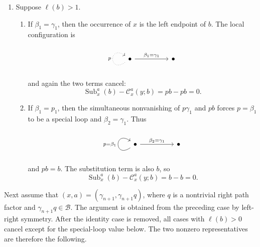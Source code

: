 \documentclass[11pt,a4paper,reqno]{amsart}
\newcommand{\mB}{\mathcal B}
\newcommand{\mC}{\mathcal C}
\newcommand{\Sub}{\operatorname{Sub}}
\newcommand{\para}[2]{(#1,#2)}
\theoremstyle{plain}
\theoremstyle{definition}
\numberwithin{equation}{section}
\begin{document}
\begin{enumerate}
		\item Suppose $\ell(b)>1$.
		\begin{enumerate}
			\item If $\beta_1=\gamma_1$, then the occurrence of $x$ is the left
			endpoint of $b$.  The local configuration is
			\[
			\begin{tikzcd}
				\bullet && \bullet
				\arrow["p", dotted, from=1-1, to=1-1, loop, in=145, out=215, distance=10mm]
				\arrow["{\beta_1=\gamma_1}", from=1-1, to=1-3]
			\end{tikzcd}
			\]
			and again the two terms cancel:
			\[
			\Sub_x^a(b)-\mC_x^a(y;b)=pb-pb=0.
			\]
			
			\item If $\beta_1=p_1$, then the simultaneous nonvanishing of
			$p\gamma_1$ and $pb$ forces $p=\beta_1$ to be a special loop and
			$\beta_2=\gamma_1$.  Thus
			\[
			\begin{tikzcd}
				\bullet && \bullet
				\arrow["{p=\beta_1}", from=1-1, to=1-1, loop, in=145, out=215, distance=10mm]
				\arrow["{\beta_2=\gamma_1}", from=1-1, to=1-3]
			\end{tikzcd}
			\]
			and $pb=b$.  The substitution term is also $b$, so
			\[
			\Sub_x^a(b)-\mC_x^a(y;b)=b-b=0.
			\]
		\end{enumerate}
	\end{enumerate}
	
	Next assume that
	$\para{x}{a}=\para{\gamma_{n+1}}{\gamma_{n+1}q}$,
	where $q$ is a nontrivial right path factor and $\gamma_{n+1}q\in\mB$.
	The argument is obtained from the preceding case by left-right symmetry.  After the identity case is removed,
	all cases with $\ell(b)>0$ cancel except for the special-loop value below.  The
	two nonzero representatives are therefore the following.
	
\end{document}
